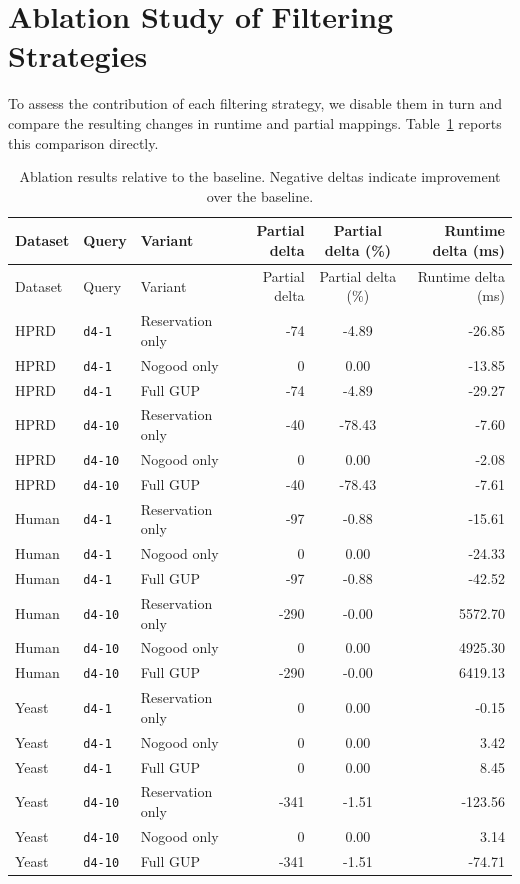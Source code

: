 \section{Ablation Study of Filtering Strategies}
\label{sec:ablation}

To assess the contribution of each filtering strategy, we disable them in turn and compare the resulting changes in runtime and partial mappings. Table~\ref{tab:ablation-results} reports this comparison directly.

\begin{longtable}{lllrcr}
  \caption{Ablation results relative to the baseline. Negative deltas indicate improvement over the baseline.}\label{tab:ablation-results}\\
  \toprule
  Dataset & Query & Variant & Partial delta & Partial delta (\%) & Runtime delta (ms) \\
  \midrule
  \endfirsthead
  \toprule
  Dataset & Query & Variant & Partial delta & Partial delta (\%) & Runtime delta (ms) \\
  \midrule
  \endhead
  HPRD & \texttt{d4-1} & Reservation only & -74 & -4.89 & -26.85 \\
  HPRD & \texttt{d4-1} & Nogood only & 0 & 0.00 & -13.85 \\
  HPRD & \texttt{d4-1} & Full GUP & -74 & -4.89 & -29.27 \\
  \midrule
  HPRD & \texttt{d4-10} & Reservation only & -40 & -78.43 & -7.60 \\
  HPRD & \texttt{d4-10} & Nogood only & 0 & 0.00 & -2.08 \\
  HPRD & \texttt{d4-10} & Full GUP & -40 & -78.43 & -7.61 \\
  \midrule
  Human & \texttt{d4-1} & Reservation only & -97 & -0.88 & -15.61 \\
  Human & \texttt{d4-1} & Nogood only & 0 & 0.00 & -24.33 \\
  Human & \texttt{d4-1} & Full GUP & -97 & -0.88 & -42.52 \\
  \midrule
  Human & \texttt{d4-10} & Reservation only & -290 & -0.00 & 5572.70 \\
  Human & \texttt{d4-10} & Nogood only & 0 & 0.00 & 4925.30 \\
  Human & \texttt{d4-10} & Full GUP & -290 & -0.00 & 6419.13 \\
  \midrule
  Yeast & \texttt{d4-1} & Reservation only & 0 & 0.00 & -0.15 \\
  Yeast & \texttt{d4-1} & Nogood only & 0 & 0.00 & 3.42 \\
  Yeast & \texttt{d4-1} & Full GUP & 0 & 0.00 & 8.45 \\
  \midrule
  Yeast & \texttt{d4-10} & Reservation only & -341 & -1.51 & -123.56 \\
  Yeast & \texttt{d4-10} & Nogood only & 0 & 0.00 & 3.14 \\
  Yeast & \texttt{d4-10} & Full GUP & -341 & -1.51 & -74.71 \\
  \bottomrule
\end{longtable}

